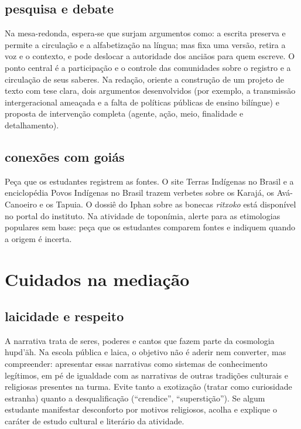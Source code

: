 \section{pesquisa e debate}

Na mesa-redonda, espera-se que surjam argumentos como: a escrita
preserva e permite a circulação e a alfabetização na língua; mas fixa
uma versão, retira a voz e o contexto, e pode deslocar a autoridade dos
anciãos para quem escreve. O ponto central é a participação e o controle
das comunidades sobre o registro e a circulação de seus saberes. Na
redação, oriente a construção de um projeto de texto com tese clara,
dois argumentos desenvolvidos (por exemplo, a transmissão
intergeracional ameaçada e a falta de políticas públicas de ensino
bilíngue) e proposta de intervenção completa (agente, ação, meio,
finalidade e detalhamento).

\section{conexões com goiás}

Peça que os estudantes registrem as fontes. O site Terras Indígenas no
Brasil e a enciclopédia Povos Indígenas no Brasil trazem verbetes sobre
os Karajá, os Avá-Canoeiro e os Tapuia. O dossiê do Iphan sobre as
bonecas \textit{ritxoko} está disponível no portal do instituto. Na
atividade de toponímia, alerte para as etimologias populares sem base:
peça que os estudantes comparem fontes e indiquem quando a origem é
incerta.

\chapter{Cuidados na mediação}

\section{laicidade e respeito}

A narrativa trata de seres, poderes e cantos que fazem parte da
cosmologia hupd'äh. Na escola pública e laica, o objetivo não é aderir
nem converter, mas compreender: apresentar essas narrativas como
sistemas de conhecimento legítimos, em pé de igualdade com as narrativas
de outras tradições culturais e religiosas presentes na turma. Evite
tanto a exotização (tratar como curiosidade estranha) quanto a
desqualificação (``crendice'', ``superstição''). Se algum estudante
manifestar desconforto por motivos religiosos, acolha e explique o
caráter de estudo cultural e literário da atividade.

